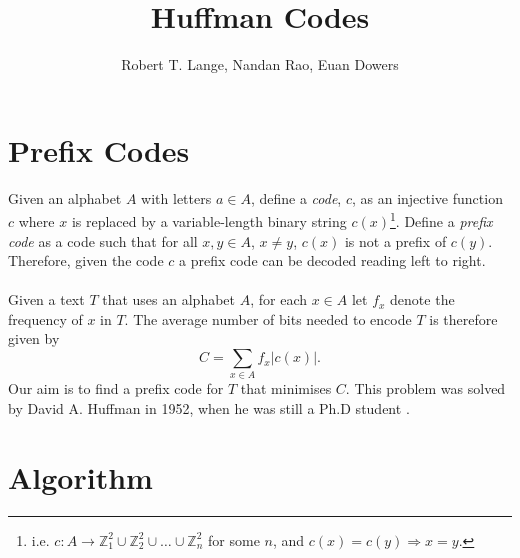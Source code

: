 \documentclass[paper=a4, fontsize=10pt]{article} %
\title{Huffman Codes}
\author{Robert T. Lange, Nandan Rao, Euan Dowers}
\date{}
\numberwithin{equation}{section} %
\numberwithin{figure}{section} %
\numberwithin{table}{section} %
\begin{document}
\maketitle %

\section{Prefix Codes}

Given an alphabet $A$ with letters $a \in A$, define a \textit{code}, $c$, as an injective function $c$ where $x$ is replaced by a variable-length binary string $c(x)$\footnote{i.e. $c:A \rightarrow \mathbb{Z}^2_1 \cup \mathbb{Z}^2_2 \cup \ldots \cup \mathbb{Z}^2_n$ for some $n$, and $c(x) = c(y) \Rightarrow x=y$. }. Define a \textit{prefix code} as a code such that for all $x,y \in A$, $x \neq y$, $c(x)$ is not a prefix of $c(y)$. Therefore, given the code $c$ a prefix code can be decoded reading left to right.
\\
\\
Given a text $T$ that uses an alphabet $A$, for each $x \in A$ let $f_x$ denote the frequency of $x$ in $T$. The average number of bits needed to encode $T$ is therefore given by
\[
C = \sum _ {x \in A} f_x | c(x) |.
\]
Our aim is to find a prefix code for $T$ that minimises $C$. This problem was solved by David A. Huffman in 1952, when he was still a Ph.D student \cite{huffman52}.


\section{Algorithm}
\end{document}
